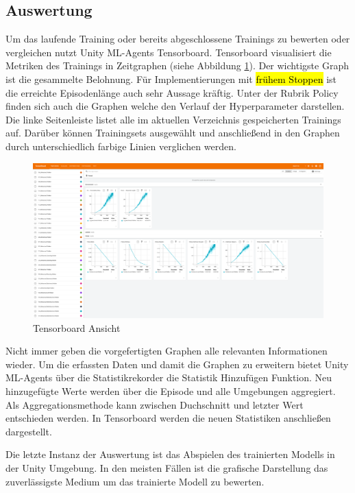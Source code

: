 \subsection{Auswertung}
Um das laufende Training oder bereits abgeschlossene Trainings zu bewerten oder vergleichen nutzt Unity ML-Agents Tensorboard. Tensorboard visualisiert die Metriken des Trainings in Zeitgraphen (siehe Abbildung \ref{fig:tensorboard}). Der wichtigste Graph ist die gesammelte Belohnung. Für Implementierungen mit \hl{frühem Stoppen} ist die erreichte Episodenlänge auch sehr Aussage kräftig. Unter der Rubrik Policy finden sich auch die Graphen welche den Verlauf der Hyperparameter darstellen. Die linke Seitenleiste listet alle im aktuellen Verzeichnis gespeicherten Trainings auf. Darüber können Trainingsets ausgewählt und anschließend in den Graphen durch unterschiedlich farbige Linien verglichen werden.

\begin{figure}[H]
  \centering  
  \includegraphics[scale=0.15]{img/tensorboard.png}
  \caption{Tensorboard Ansicht}
  \label{fig:tensorboard}
\end{figure}

Nicht immer geben die vorgefertigten Graphen alle relevanten Informationen wieder. Um die erfassten Daten und damit die Graphen zu erweitern bietet Unity ML-Agents über die Statistikrekorder die Statistik Hinzufügen Funktion. Neu hinzugefügte Werte werden über die Episode und alle Umgebungen aggregiert. Als Aggregationsmethode kann zwischen Duchschnitt und letzter Wert entschieden werden. In Tensorboard werden die neuen Statistiken anschließen dargestellt.

Die letzte Instanz der Auswertung ist das Abspielen des trainierten Modells in der Unity Umgebung. In den meisten Fällen ist die grafische Darstellung das zuverlässigste Medium um das trainierte Modell zu bewerten.